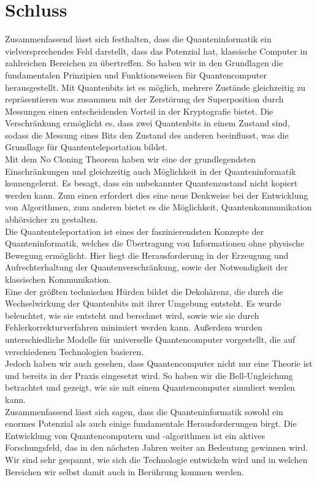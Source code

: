 \section{Schluss}
\label{sec:schluss}

Zusammenfassend lässt sich festhalten, dass die Quanteninformatik ein vielversprechendes Feld darstellt, dass das Potenzial hat, klassische Computer in zahlreichen Bereichen zu übertreffen.
So haben wir in den Grundlagen die fundamentalen Prinzipien und Funktionsweisen für Quantencomputer herausgestellt.
Mit Quantenbits ist es möglich, mehrere Zustände gleichzeitig zu repräsentieren was zusammen mit der Zerstörung der Superposition durch Messungen einen entscheidenden Vorteil in der Kryptografie bietet.
Die Verschränkung ermöglicht es, dass zwei Quantenbits in einem Zustand sind, sodass die Messung eines Bits den Zustand des anderen beeinflusst, was die Grundlage für Quantenteleportation bildet.\\

Mit dem No Cloning Theorem haben wir eine der grundlegendsten Einschränkungen und gleichzeitig auch Möglichkeit in der Quanteninformatik kennengelernt.
Es besagt, dass ein unbekannter Quantenzustand nicht kopiert werden kann.
Zum einen erfordert dies eine neue Denkweise bei der Entwicklung von Algorithmen, zum anderen bietet es die Möglichkeit, Quantenkommunikation abhörsicher zu gestalten.\\

Die Quantenteleportation ist eines der faszinierendsten Konzepte der Quanteninformatik, welches die Übertragung von Informationen ohne physische Bewegung ermöglicht.
Hier liegt die Herausforderung in der Erzeugung und Aufrechterhaltung der Quantenverschränkung, sowie der Notwendigkeit der klassischen Kommunikation.\\

Eine der größten technischen Hürden bildet die Dekohärenz, die durch die Wechselwirkung der Quantenbits mit ihrer Umgebung entsteht.
Es wurde beleuchtet, wie sie entsteht und berechnet wird, sowie wie sie durch Fehlerkorrekturverfahren minimiert werden kann.
Außerdem wurden unterschiedliche Modelle für universelle Quantencomputer vorgestellt, die auf verschiedenen Technologien basieren.\\

Jedoch haben wir auch gesehen, dass Quantencomputer nicht nur eine Theorie ist und bereits in der Praxis eingesetzt wird.
So haben wir die Bell-Ungleichung betrachtet und gezeigt, wie sie mit einem Quantencomputer simuliert werden kann.\\

Zusammenfassend lässt sich sagen, dass die Quanteninformatik sowohl ein enormes Potenzial als auch einige fundamentale Herausforderungen birgt.
Die Entwicklung von Quantencomputern und -algorithmen ist ein aktives Forschungsfeld, das in den nächsten Jahren weiter an Bedeutung gewinnen wird.
Wir sind sehr gespannt, wie sich die Technologie entwickeln wird und in welchen Bereichen wir selbst damit auch in Berührung kommen werden.









